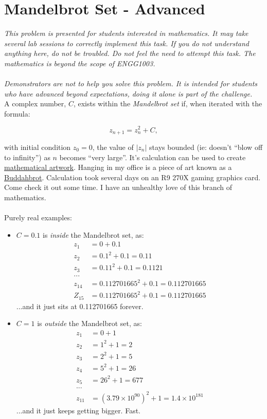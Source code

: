 \documentclass{lab}
\begin{document}
\pagebreak
\section{Mandelbrot Set - Advanced}
\textit{This problem is presented for students interested in mathematics. It may take several lab sessions to correctly implement this task. If you do not understand anything here, do not be troubled. Do not feel the need to attempt this task. The mathematics is beyond the scope of ENGG1003.} \\ \\
\textit{Demonstrators are not to help you solve this problem. It is intended for students who have advanced beyond expectations, doing it alone is part of the challenge.}\\

A complex number, $C$, exists within the \textit{Mandelbrot set} if, when iterated with the formula:

\begin{equation}
z_{n+1} = z^2_n + C,
\end{equation}

with initial condition $z_0 = 0$, the value of $\left|z_n\right|$ stays bounded (ie: doesn't ``blow off to infinity'') as $n$ becomes ``very large''. It's calculation can be used to create \underline{\href{https://www.google.com.au/search?q=mandelbrot+set}{mathematical artwork}}. Hanging in my office is a piece of art known as a \underline{\href{https://www.google.com.au/search?q=buddahbrot}{Buddahbrot}}. Calculation took several days on an R9 270X gaming graphics card. Come check it out some time. I have an unhealthy love of this branch of mathematics.
\\ \\
Purely real examples:
\begin{itemize}
\item $C = 0.1$ is \textit{inside} the Mandelbrot set, as:
\begin{align}
z_1 &= 0 + 0.1 \\
z_2 &= 0.1^2 + 0.1 = 0.11 \\
z_3 &= 0.11^2 + 0.1 = 0.1121 \\
... \\
z_{14} &= 0.112701665^2 + 0.1 = 0.112701665 \\
Z_{15} &= 0.112701665^2 + 0.1 = 0.112701665 
\end{align}
...and it just sits at 0.112701665 forever.
\item $C = 1$ is \textit{outside} the Mandelbrot set, as:
\begin{align}
z_1 &= 0 + 1 \\
z_2 &= 1^2 + 1 = 2 \\
z_3 &= 2^2 + 1 = 5 \\
z_4 &= 5^2 + 1 = 26 \\
z_5 &= 26^2 + 1 = 677 \\
... \\
z_{11} &= (3.79 \times 10^{90})^2 + 1 = 1.4 \times 10^{181}
\end{align}
...and it just keeps getting bigger. Fast.
\end{itemize}
\end{document}
